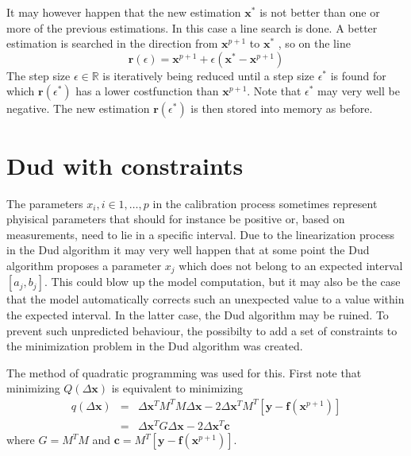 It may however happen that the new estimation $\mathbf{x}^\ast$ is not better
than one or more of the previous estimations. In this case a line search is
done. A better estimation is searched in the direction from $\mathbf{x}^{p+1}$
to $\mathbf{x}^\ast$ , so on the line
\begin{equation}
\mathbf{r}(\epsilon) = \mathbf{x}^{p+1} + \epsilon (\mathbf{x}^\ast - \mathbf{x}^{p+1} )
\end{equation}
The step size $\epsilon \in \mathbb{R}$ is iteratively being reduced until a
step size $\epsilon^\ast$ is found for which $\mathbf{r}(\epsilon^\ast)$ has a
lower costfunction than $\mathbf{x}^{p+1}$. Note that $\epsilon^\ast$ may very
well be negative. The new estimation $\mathbf{r}(\epsilon^\ast)$ is then stored
into memory as before.



\section{Dud with constraints}

The parameters $x_i, i \in {1, \ldots, p}$ in the calibration process sometimes
represent phyisical parameters that should for instance be positive or, based
on measurements, need to lie in a specific interval. Due to the linearization
process in the Dud algorithm it may very well happen that at some point the Dud
algorithm proposes a parameter $x_j$ which does not belong to an expected
interval $[a_j , b_j]$. This could blow up the model computation, but it may
also be the case that the model automatically corrects such an unexpected value
to a value within the expected interval. In the latter case, the Dud algorithm
may be ruined. To prevent such unpredicted behaviour, the possibilty to add a
set of constraints to the minimization problem in the Dud algorithm was
created.

The method of quadratic programming was used for this. First note that
minimizing $Q(\Delta \mathbf{x})$ is equivalent to minimizing
\begin{eqnarray}
q(\Delta \mathbf{x}) &=& \Delta \mathbf{x}^T M^TM \Delta \mathbf{x} − 2\Delta \mathbf{x}^T M^T \left[\mathbf{y} - \mathbf{f}(\mathbf{x}^{p+1})\right]\nonumber\\
 &=& \Delta \mathbf{x}^T G\Delta \mathbf{x} - 2\Delta \mathbf{x}^T \mathbf{c}
\end{eqnarray}
where $G = M^T M$ and $\mathbf{c} = M^T \left[\mathbf{y}
- \mathbf{f}(\mathbf{x}^{p+1})\right]$.

